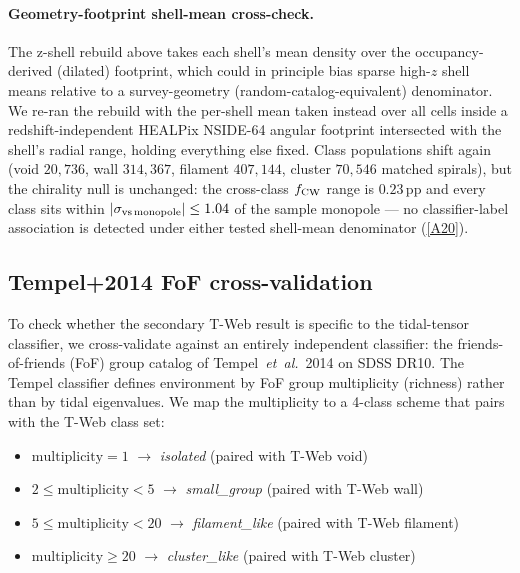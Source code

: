 \documentclass[aps,prd,twocolumn,superscriptaddress,showpacs,preprintnumbers,nofootinbib,longbibliography,floatfix]{revtex4-2}
\newcommand{\repoBase}{https://github.com/Hubify-Projects/bigbounce/blob/main}
\begin{document}
\paragraph{Geometry-footprint shell-mean cross-check.} The z-shell
rebuild above takes each shell's mean density over the
occupancy-derived (dilated) footprint, which could in principle bias
sparse high-$z$ shell means relative to a survey-geometry
(random-catalog-equivalent) denominator. We re-ran the rebuild with
the per-shell mean taken instead over all cells inside a
redshift-independent HEALPix NSIDE-64 angular footprint intersected
with the shell's radial range, holding everything else fixed. Class
populations shift again (void $20{,}736$, wall $314{,}367$, filament
$407{,}144$, cluster $70{,}546$ matched spirals), but the chirality
null is unchanged: the cross-class $f_{\rm CW}$ range is
$0.23$\,pp and every class sits within $|\sigma_{\rm vs\,monopole}|
\le 1.04$ of the sample monopole — no classifier-label association is
detected under either tested shell-mean denominator
(\href{\repoBase/pipelines/p5\_desi\_chirality/outputs/19\_v0151\_zshell\_geofootprint\_check.json}{[A20]}).

\subsection{Tempel+2014 FoF cross-validation}\label{sec:tempel}

To check whether the secondary T-Web result is specific to the
tidal-tensor classifier, we cross-validate against an entirely
independent classifier: the friends-of-friends (FoF) group catalog of
Tempel~\textit{et~al.}~2014 \cite{Tempel2014} on SDSS DR10. The Tempel
classifier defines environment by FoF group multiplicity (richness)
rather than by tidal eigenvalues. We map the multiplicity to a 4-class
scheme that pairs with the T-Web class set:

\begin{itemize}
\item $\mathrm{multiplicity}\!=\!1$ $\to$ \emph{isolated} (paired with T-Web void)
\item $2 \le \mathrm{multiplicity} < 5$ $\to$ \emph{small\_group} (paired with T-Web wall)
\item $5 \le \mathrm{multiplicity} < 20$ $\to$ \emph{filament\_like} (paired with T-Web filament)
\item $\mathrm{multiplicity} \ge 20$ $\to$ \emph{cluster\_like} (paired with T-Web cluster)
\end{itemize}
\end{document}
